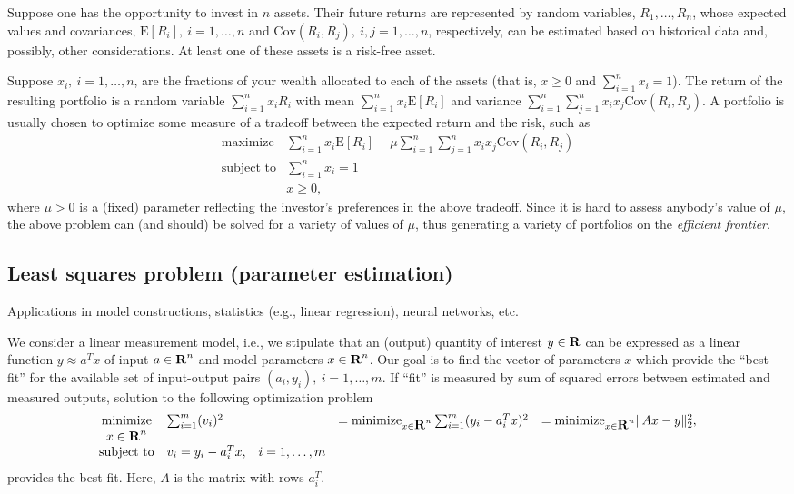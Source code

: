 \documentclass[11pt]{article}
\newcommand{\st}{\text{subject to}}
\begin{document}
Suppose one has the opportunity to invest in $n$ assets. Their future returns are represented by random variables, $R_1,\ldots,R_n$, whose expected values and covariances, $\text{E}[R_i],\ i=1,\ldots,n$ and $\text{Cov}(R_i,R_j),\ i,j=1,\ldots,n$, respectively, can be estimated based on historical data and, possibly, other considerations. At least one of these assets is a risk-free asset.

Suppose $x_i,\ i=1,\ldots,n$, are the fractions of your wealth allocated to each of the assets (that is, $x\ge0$ and $\sum_{i=1}^nx_i=1$). The return of the resulting portfolio is a random variable $\sum_{i=1}^nx_iR_i$ with mean $\sum_{i=1}^nx_i\text{E}[R_i]$ and variance $\sum_{i=1}^n\sum_{j=1}^nx_ix_j\text{Cov}(R_i,R_j)$. A portfolio is usually chosen to optimize some measure of a tradeoff between the expected return and the risk, such as
$$
\begin{array}{cl}
\text{maximize}&\sum_{i=1}^nx_i\text{E}[R_i]-\mu\sum_{i=1}^n\sum_{j=1}^nx_ix_j\text{Cov}(R_i,R_j)\\
\st&\sum_{i=1}^nx_i=1\\
&x\ge0,
\end{array}
$$
where $\mu>0$ is a (fixed) parameter reflecting the investor's preferences in the above tradeoff. Since it is hard to assess anybody's value of $\mu$, the above problem can (and should) be solved for a variety of values of $\mu$, thus generating a variety of portfolios on the \emph{efficient frontier}.

\subsection{Least squares problem (parameter estimation)}

Applications in model constructions, statistics (e.g., linear regression), neural networks, etc.

We consider a linear measurement model, i.e., we stipulate that an (output) quantity of interest $y\in{\mbox{\textbf{R}}}$ can be expressed as a linear function $y\approx a^Tx$ of input $a\in{\mbox{\textbf{R}}}^n$ and model parameters $x\in{\mbox{\textbf{R}}}^n$. Our goal is to find the vector of parameters $x$ which provide the ``best fit'' for the available set of input-output pairs $(a_i,y_i),\ i=1,\ldots,m$. If ``fit'' is measured by sum of squared errors between estimated and measured outputs, solution to the following optimization problem
$$
\begin{array}{cllll}
\text{minimize}&\sum_{i=1}^m(v_i)^2&&=\text{minimize}_{x\in\reals^n}\sum_{i=1}^m(y_i-a_i^Tx)^2&=\text{minimize}_{x\in\reals^n}\|Ax-y\|_2^2,\\
x\in\reals^n\\
\st&v_i=y_i-a_i^Tx,&i=1,\ldots,m\\
\end{array}
$$
provides the best fit. Here, $A$ is the matrix with rows $a_i^T$.
\end{document}

